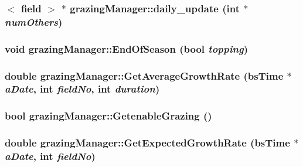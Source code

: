 \label{classgrazing_manager_abc0c9f087272175f7d3f7f7d099c7fd8}
\hypertarget{classgrazing_manager_add090eda9935ad4665d5388587aa5801}{
\subsubsection[{daily\_\-update}]{$<$ {\bf field} $>$ $\ast$ grazingManager::daily\_\-update (int $\ast$ {\em numOthers})}}
\label{classgrazing_manager_add090eda9935ad4665d5388587aa5801}
\hypertarget{classgrazing_manager_a6d936f90c10dfc4f5bf7e7eddc3b85c0}{
\subsubsection[{EndOfSeason}]{\setlength{\rightskip}{0pt plus 5cm}void grazingManager::EndOfSeason (bool {\em topping})}}
\label{classgrazing_manager_a6d936f90c10dfc4f5bf7e7eddc3b85c0}
\hypertarget{classgrazing_manager_a92d31c0f475ac2aaed6b01b1b72d5a57}{
\subsubsection[{GetAverageGrowthRate}]{\setlength{\rightskip}{0pt plus 5cm}double grazingManager::GetAverageGrowthRate ({\bf bsTime} $\ast$ {\em aDate}, \/  int {\em fieldNo}, \/  int {\em duration})}}
\label{classgrazing_manager_a92d31c0f475ac2aaed6b01b1b72d5a57}
\hypertarget{classgrazing_manager_a434fb905e1ade1610778a54baebb3cb3}{
\subsubsection[{GetenableGrazing}]{\setlength{\rightskip}{0pt plus 5cm}bool grazingManager::GetenableGrazing ()}}
\label{classgrazing_manager_a434fb905e1ade1610778a54baebb3cb3}
\hypertarget{classgrazing_manager_aa45455953b5da3c6c7898c9e99bb274b}{
\subsubsection[{GetExpectedGrowthRate}]{\setlength{\rightskip}{0pt plus 5cm}double grazingManager::GetExpectedGrowthRate ({\bf bsTime} $\ast$ {\em aDate}, \/  int {\em fieldNo})}}
